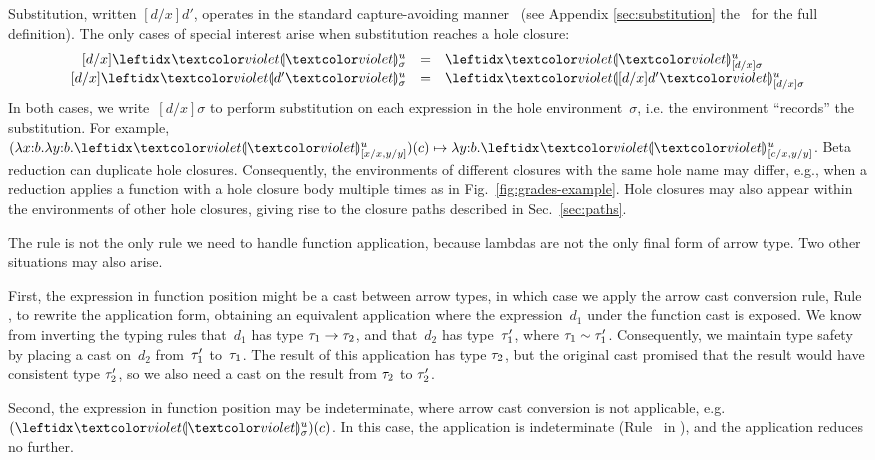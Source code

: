 Substitution, written $[d/x]d'$, operates in the standard capture-avoiding manner~\cite{pfpl} (see \ifarxiv Appendix \ref{sec:substitution} \else the \appendixName~\fi for the full definition).
%
The only cases of special interest arise when substitution reaches a hole closure:
\[
\begin{array}{rcl}
  [d/x]\dehole{u}{\sigma}{} & = & \dehole{u}{[d/x]\sigma}{} \\%
  \substitute{d}{x}{\dhole{d'}{u}{\sigma}{}} & = & \dhole{[d/x]d'}{u}{[d/x]\sigma}{}
\end{array}
\]
In both cases, we write~$[d/x]\sigma$ to perform substitution on each expression in the hole environment~$\sigma$, i.e. the environment ``records'' the substitution.
%
For example, $\stepsToD{}
    {\hap{(\halam{x}{b}{\halam{y}{b}{\dehole{u}{[x/x, y/y]}{}}})}{c}}
    {\halam{y}{b}{\dehole{u}{[c/x, y/y]}{}}}$.
%
Beta reduction can duplicate hole closures.
%
Consequently, the environments of different closures with the same hole name may differ,
e.g., when a reduction applies a function with a hole closure body multiple times as in Fig.~\ref{fig:grades-example}.
Hole closures may also appear within the environments of other hole
closures, giving rise to the closure paths described in
Sec.~\ref{sec:paths}.



The  rule is not the only rule we need to handle function
application, because lambdas are not the only final form of arrow type.
%
Two other situations may also arise.

First, the expression in function position might be a cast between
arrow types, in which case we apply the arrow cast conversion rule,
Rule , to rewrite the application form, obtaining an
equivalent application where the expression~$d_1$ under the function
cast is exposed.
%
We know from inverting the typing rules that~$d_1$ has type
$\tau_1 \rightarrow \tau_2$, and that~$d_2$ has type~$\tau_1'$, where
$\tau_1 \sim \tau_1'$.
Consequently, we maintain type
safety by placing a cast on~$d_2$ from~$\tau_1'$ to~$\tau_1$.
%
The result of this application has type $\tau_2$, but the
original cast promised that the result would have consistent type
$\tau_2'$, so we also need a cast on the result from $\tau_2$ to
$\tau_2'$.

Second, the expression in function position may be indeterminate,
where arrow cast conversion is not applicable,
e.g. $\hap{(\dehole{u}{\sigma}{})}{c}$.
%
In this case, the application is indeterminate (Rule~
in ), and the application reduces no
further.


